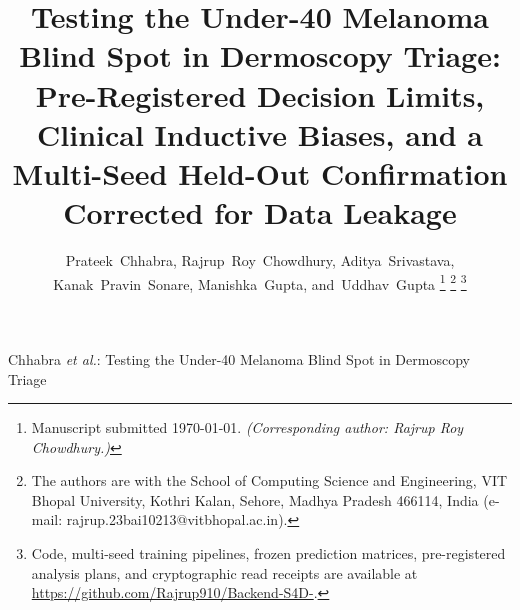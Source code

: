 \documentclass[journal]{IEEEtran}
\begin{document}
\title{Testing the Under-40 Melanoma Blind Spot in Dermoscopy Triage: Pre-Registered Decision Limits, Clinical Inductive Biases, and a Multi-Seed Held-Out Confirmation Corrected for Data Leakage}

\author{Prateek~Chhabra,
        Rajrup~Roy~Chowdhury,
        Aditya~Srivastava,
        Kanak~Pravin~Sonare,
        Manishka~Gupta,
        and~Uddhav~Gupta%
\thanks{Manuscript submitted \today. \emph{(Corresponding author: Rajrup Roy Chowdhury.)}}%
\thanks{The authors are with the School of Computing Science and Engineering,
VIT Bhopal University, Kothri Kalan, Sehore, Madhya Pradesh 466114, India
(e-mail: rajrup.23bai10213@vitbhopal.ac.in).}%
\thanks{Code, multi-seed training pipelines, frozen prediction matrices, pre-registered analysis plans,
and cryptographic read receipts are available at
\url{https://github.com/Rajrup910/Backend-S4D-}.}}

%
{Chhabra \MakeLowercase{\textit{et al.}}: Testing the Under-40 Melanoma Blind Spot in Dermoscopy Triage}

\maketitle
\end{document}
